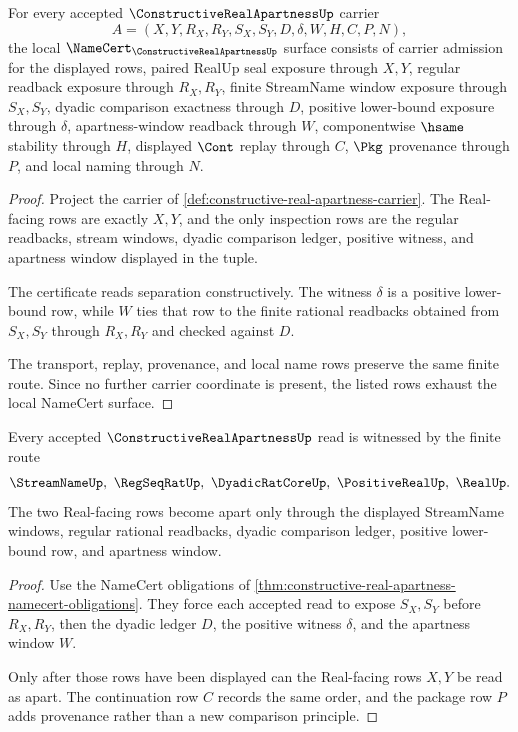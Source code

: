 \begin{theorem}
\label{thm:constructive-real-apartness-namecert-obligations}
For every accepted $\ConstructiveRealApartnessUp$ carrier
$$
A=(X,Y,R_X,R_Y,S_X,S_Y,D,\delta,W,H,C,P,N),
$$
the local $\NameCert_{\ConstructiveRealApartnessUp}$ surface consists of carrier admission for the displayed rows, paired RealUp seal exposure through $X,Y$, regular readback exposure through $R_X,R_Y$, finite StreamName window exposure through $S_X,S_Y$, dyadic comparison exactness through $D$, positive lower-bound exposure through $\delta$, apartness-window readback through $W$, componentwise $\hsame$ stability through $H$, displayed $\Cont$ replay through $C$, $\Pkg$ provenance through $P$, and local naming through $N$.
\end{theorem}
\begin{proof}
Project the carrier of \autoref{def:constructive-real-apartness-carrier}. The Real-facing rows are exactly $X,Y$, and the only inspection rows are the regular readbacks, stream windows, dyadic comparison ledger, positive witness, and apartness window displayed in the tuple.

The certificate reads separation constructively. The witness $\delta$ is a positive lower-bound row, while $W$ ties that row to the finite rational readbacks obtained from $S_X,S_Y$ through $R_X,R_Y$ and checked against $D$.

The transport, replay, provenance, and local name rows preserve the same finite route. Since no further carrier coordinate is present, the listed rows exhaust the local NameCert surface.
\end{proof}

\begin{theorem}
\label{thm:constructive-real-apartness-finite-readback}
Every accepted $\ConstructiveRealApartnessUp$ read is witnessed by the finite route
$$
\StreamNameUp,\ \RegSeqRatUp,\ \DyadicRatCoreUp,\ \PositiveRealUp,\ \RealUp .
$$
The two Real-facing rows become apart only through the displayed StreamName windows, regular rational readbacks, dyadic comparison ledger, positive lower-bound row, and apartness window.
\end{theorem}
\begin{proof}
Use the NameCert obligations of \autoref{thm:constructive-real-apartness-namecert-obligations}. They force each accepted read to expose $S_X,S_Y$ before $R_X,R_Y$, then the dyadic ledger $D$, the positive witness $\delta$, and the apartness window $W$.

Only after those rows have been displayed can the Real-facing rows $X,Y$ be read as apart. The continuation row $C$ records the same order, and the package row $P$ adds provenance rather than a new comparison principle.
\end{proof}

